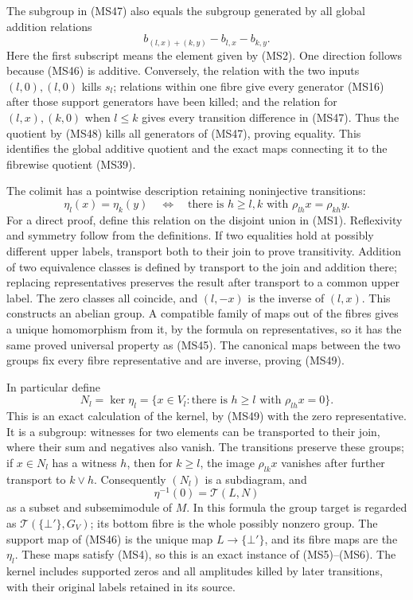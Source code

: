 \documentclass[
]{article}
\begin{document}
The subgroup in (MS47) also equals the subgroup generated by all global
addition relations \[
b_{(l,x)+(k,y)}-b_{l,x}-b_{k,y}.
\tag{MS48}
\] Here the first subscript means the element given by (MS2). One
direction follows because (MS46) is additive. Conversely, the relation
with the two inputs \((l,0),(l,0)\) kills \(s_l\); relations within one
fibre give every generator (MS16) after those support generators have
been killed; and the relation for \((l,x),(k,0)\) when \(l\le k\) gives
every transition difference in (MS47). Thus the quotient by (MS48) kills
all generators of (MS47), proving equality. This identifies the global
additive quotient and the exact maps connecting it to the fibrewise
quotient (MS39).

The colimit has a pointwise description retaining noninjective
transitions: \[
\eta_l(x)=\eta_k(y)
\quad\Longleftrightarrow\quad
\text{there is }h\ge l,k\text{ with }\rho_{lh}x=\rho_{kh}y.
\tag{MS49}
\] For a direct proof, define this relation on the disjoint union in
(MS1). Reflexivity and symmetry follow from the definitions. If two
equalities hold at possibly different upper labels, transport both to
their join to prove transitivity. Addition of two equivalence classes is
defined by transport to the join and addition there; replacing
representatives preserves the result after transport to a common upper
label. The zero classes all coincide, and \((l,-x)\) is the inverse of
\((l,x)\). This constructs an abelian group. A compatible family of maps
out of the fibres gives a unique homomorphism from it, by the formula on
representatives, so it has the same proved universal property as (MS45).
The canonical maps between the two groups fix every fibre representative
and are inverse, proving (MS49).

In particular define \[
N_l=\ker\eta_l
=\{x\in V_l:\text{there is }h\ge l\text{ with }\rho_{lh}x=0\}.
\tag{MS50}
\] This is an exact calculation of the kernel, by (MS49) with the zero
representative. It is a subgroup: witnesses for two elements can be
transported to their join, where their sum and negatives also vanish.
The transitions preserve these groups; if \(x\in N_l\) has a witness
\(h\), then for \(k\ge l\), the image \(\rho_{lk}x\) vanishes after
further transport to \(k\vee h\). Consequently \((N_l)\) is a
subdiagram, and \[
\eta^{-1}(0)=\mathcal T(L,N)
\tag{MS51}
\] as a subset and subsemimodule of \(M\). In this formula the group
target is regarded as \(\mathcal T(\{\bot'\},G_V)\); its bottom fibre is
the whole possibly nonzero group. The support map of (MS46) is the
unique map \(L\to\{\bot'\}\), and its fibre maps are the \(\eta_l\).
These maps satisfy (MS4), so this is an exact instance of (MS5)--(MS6).
The kernel includes supported zeros and all amplitudes killed by later
transitions, with their original labels retained in its source.
\end{document}
